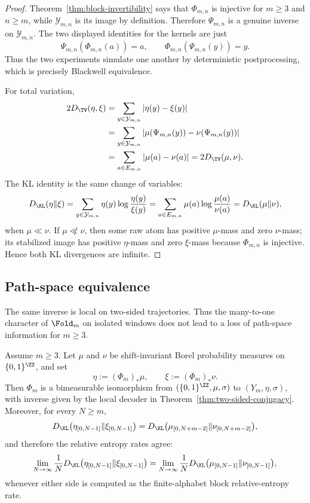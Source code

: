 \begin{proof}
Theorem~\ref{thm:block-invertibility} says that $\Phi_{m,n}$ is injective for
$m\ge3$ and $n\ge m$, while $\mathcal Y_{m,n}$ is its image by definition.
Therefore $\Psi_{m,n}$ is a genuine inverse on $\mathcal Y_{m,n}$.  The two
displayed identities for the kernels are just
\[
\Psi_{m,n}(\Phi_{m,n}(a))=a,\qquad
\Phi_{m,n}(\Psi_{m,n}(y))=y.
\]
Thus the two experiments simulate one another by deterministic postprocessing,
which is precisely Blackwell equivalence.

For total variation,
\[
\begin{aligned}
2D_{\TV}(\eta,\xi)
&=\sum_{y\in\mathcal Y_{m,n}}|\eta(y)-\xi(y)|  \\
&=\sum_{y\in\mathcal Y_{m,n}}
|\mu(\Psi_{m,n}(y))-\nu(\Psi_{m,n}(y))|       \\
&=\sum_{a\in E_{m,n}}|\mu(a)-\nu(a)|
=2D_{\TV}(\mu,\nu).
\end{aligned}
\]
The KL identity is the same change of variables:
\[
D_{\KL}(\eta\|\xi)
=\sum_{y\in\mathcal Y_{m,n}}
\eta(y)\log\frac{\eta(y)}{\xi(y)}
=\sum_{a\in E_{m,n}}
\mu(a)\log\frac{\mu(a)}{\nu(a)}
=D_{\KL}(\mu\|\nu),
\]
when $\mu\ll\nu$.  If $\mu\not\ll\nu$, then some raw atom has positive
$\mu$-mass and zero $\nu$-mass; its stabilized image has positive $\eta$-mass
and zero $\xi$-mass because $\Phi_{m,n}$ is injective.  Hence both KL
divergences are infinite.
\end{proof}

\subsection{Path-space equivalence}

The same inverse is local on two-sided trajectories. Thus the many-to-one
character of $\Fold_m$ on isolated windows does not lead to a loss of
path-space information for $m\ge3$.

\begin{corollary}\label{cor:path-space-divergence}
Assume $m\ge3$.  Let $\mu$ and $\nu$ be shift-invariant Borel probability
measures on $\{0,1\}^{\ZZ}$, and set
\[
\eta:=(\Phi_m)_*\mu,\qquad \xi:=(\Phi_m)_*\nu .
\]
Then $\Phi_m$ is a bimeasurable isomorphism from
$(\{0,1\}^{\ZZ},\mu,\sigma)$ to $(Y_m,\eta,\sigma)$, with inverse given by the
local decoder in Theorem~\ref{thm:two-sided-conjugacy}.  Moreover, for every
$N\ge m$,
\[
D_{\KL}\bigl(\eta_{[0,N-1]}\|\xi_{[0,N-1]}\bigr)
=
D_{\KL}\bigl(\mu_{[0,N+m-2]}\|\nu_{[0,N+m-2]}\bigr),
\]
and therefore the relative entropy rates agree:
\[
\lim_{N\to\infty}\frac1N
D_{\KL}\bigl(\eta_{[0,N-1]}\|\xi_{[0,N-1]}\bigr)
=
\lim_{N\to\infty}\frac1N
D_{\KL}\bigl(\mu_{[0,N-1]}\|\nu_{[0,N-1]}\bigr),
\]
whenever either side is computed as the finite-alphabet block relative-entropy
rate.
\end{corollary}

